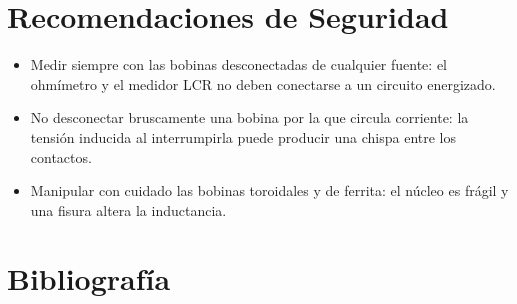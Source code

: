 \documentclass[12pt]{article}
\begin{document}
\section{Recomendaciones de Seguridad}\label{sec:seguridad}
\begin{itemize}
  \item Medir siempre con las bobinas desconectadas de cualquier fuente: el ohmímetro y el medidor LCR no deben conectarse a un circuito energizado.
  \item No desconectar bruscamente una bobina por la que circula corriente: la tensión inducida al interrumpirla puede producir una chispa entre los contactos.
  \item Manipular con cuidado las bobinas toroidales y de ferrita: el núcleo es frágil y una fisura altera la inductancia.
\end{itemize}

\section{Bibliografía}\label{sec:bibliografia}
\nocite{*}
\bibliografia
\end{document}
